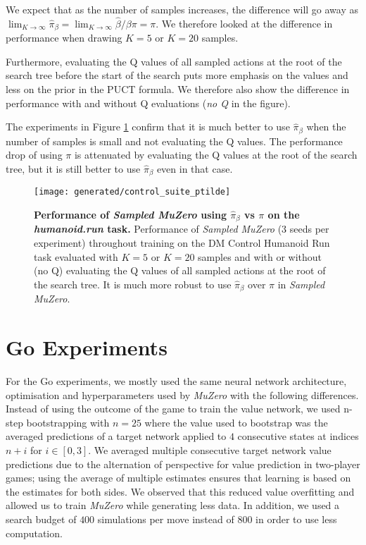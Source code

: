 \documentclass{article}
\newcommand{\muzero}{\emph{MuZero}}
\newcommand{\smuzero}{\emph{Sampled MuZero}}
\newcommand{\sample}{\beta}
\begin{document}
We expect that as the number of samples increases, the difference will go away as $\lim_{K\to\infty} \hat{\pi}_\sample = \lim_{K\to\infty} \hat{\sample}/\sample \pi = \pi$. We therefore looked at the difference in performance when drawing $K=5$ or $K=20$ samples.

Furthermore, evaluating the Q values of all sampled actions at the root of the search tree before the start of the search puts more emphasis on the values and less on the prior in the PUCT formula. We therefore also show the difference in performance with and without Q evaluations (\emph{no Q} in the figure).

The experiments in Figure \ref{fig:control-suite-ptilde} confirm that it is much better to use $\hat{\pi}_\sample$ when the number of samples is small and not  evaluating the Q values. The performance drop of using $\pi$ is attenuated by evaluating the Q values at the root of the search tree, but it is still better to use $\hat{\pi}_\sample$ even in that case.


\begin{figure}
\texttt{[image: generated/control\_suite\_ptilde]}
\vspace*{-7mm}
\caption[]{
\label{fig:control-suite-ptilde}
\textbf{Performance of \smuzero{} using $\hat{\pi}_\sample$ vs $\pi$ on the \emph{humanoid.run} task.} Performance of \smuzero{} (3 seeds per experiment) throughout training on the DM Control Humanoid Run task evaluated with $K=5$ or $K=20$ samples and with or without (no Q) evaluating the Q values of all sampled actions at the root of the search tree. It is much more robust to use $\hat{\pi}_\sample$ over $\pi$ in \smuzero{}.
}
\end{figure}


\section{Go Experiments}
For the Go experiments, we mostly used the same neural network architecture, optimisation and hyperparameters used by \muzero{} \cite{muzero} with the following differences. Instead of using the outcome of the game to train the value network, we used n-step bootstrapping with $n=25$ where the value used to bootstrap was the averaged predictions of a target network applied to $4$ consecutive states at indices $n+i$ for $i\in\left[0, 3\right]$. We averaged multiple consecutive target network value predictions due to the alternation of perspective for value prediction in two-player games; using the average of multiple estimates ensures that learning is based on the estimates for both sides. We observed that this reduced value overfitting and allowed us to train \muzero{} while generating less data. In addition, we used a search budget of $400$ simulations per move instead of $800$ in order to use less computation.
\end{document}
